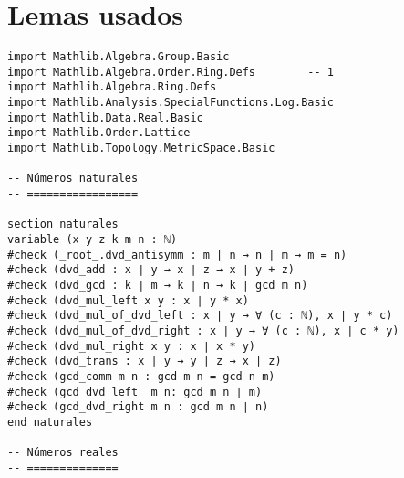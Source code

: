 \chapter*{Lemas usados}
\begin{verbatim}
import Mathlib.Algebra.Group.Basic
import Mathlib.Algebra.Order.Ring.Defs        -- 1
import Mathlib.Algebra.Ring.Defs
import Mathlib.Analysis.SpecialFunctions.Log.Basic
import Mathlib.Data.Real.Basic
import Mathlib.Order.Lattice
import Mathlib.Topology.MetricSpace.Basic

-- Números naturales
-- =================

section naturales
variable (x y z k m n : ℕ)
#check (_root_.dvd_antisymm : m ∣ n → n ∣ m → m = n)
#check (dvd_add : x ∣ y → x ∣ z → x ∣ y + z)
#check (dvd_gcd : k ∣ m → k ∣ n → k ∣ gcd m n)
#check (dvd_mul_left x y : x ∣ y * x)
#check (dvd_mul_of_dvd_left : x ∣ y → ∀ (c : ℕ), x ∣ y * c)
#check (dvd_mul_of_dvd_right : x ∣ y → ∀ (c : ℕ), x ∣ c * y)
#check (dvd_mul_right x y : x ∣ x * y)
#check (dvd_trans : x ∣ y → y ∣ z → x ∣ z)
#check (gcd_comm m n : gcd m n = gcd n m)
#check (gcd_dvd_left  m n: gcd m n ∣ m)
#check (gcd_dvd_right m n : gcd m n ∣ n)
end naturales

-- Números reales
-- ==============


\end{verbatim}
